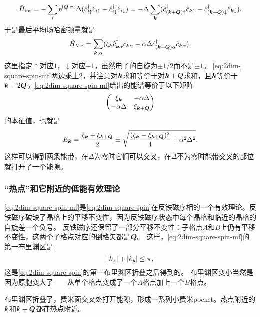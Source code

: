 \documentclass[hyperref, UTF8, a4paper]{ctexart}
\newcommand*{\ii}{\mathrm{i}}
\newcommand*{\ee}{\mathrm{e}}
\begin{document}
\begin{equation}
    \hat{H}_\text{int} = - \sum_i \ee^{\ii \vb*{Q} \cdot \vb*{r}_i} \Delta (\hat{c}_{i\uparrow}^\dagger \hat{c}_{i \uparrow} - \hat{c}_{i \downarrow}^\dagger \hat{c}_{i \downarrow}) 
    = - \Delta \sum_{\vb*{k}} (\hat{c}_{(\vb*{k} + \vb*{Q})\uparrow}^\dagger \hat{c}_{\vb*{k} \uparrow} - \hat{c}_{(\vb*{k}+\vb*{Q}) \downarrow}^\dagger \hat{c}_{\vb*{k} \downarrow}).
\end{equation}
于是最后平均场哈密顿量就是
\begin{equation}
    \hat{H}_\text{MF} = \sum_{\vb*{k}, \alpha} (\xi_{\vb*{k}} \hat{c}_{\vb*{k} \alpha}^\dagger \hat{c}_{\vb*{k} \alpha} - \alpha \Delta \hat{c}_{(\vb*{k} + \vb*{Q}) \alpha}^\dagger \hat{c}_{\vb*{k} \alpha}).
    \label{eq:2dim-square-spin-mf}
\end{equation}
这里指定$\uparrow$对应$1$，$\downarrow$对应$-1$，虽然电子的自旋为$\pm 1/2$而不是$\pm 1$。
\eqref{eq:2dim-square-spin-mf}两边乘上2，并注意对$\vb*{k}$求和等价于对$\vb*{k}+Q$求和，且$\vb*{k}$等价于$\vb*{k}+2\vb*{Q}$，\eqref{eq:2dim-square-spin-mf}给出的能谱等价于以下矩阵
\[
    \pmqty{\xi_{\vb*{k}} & - \alpha \Delta \\ - \alpha \Delta & \xi_{\vb*{k} + \vb*{Q}}}
\]
的本征值，也就是
\begin{equation}
    E_{\vb*{k}} = \frac{\xi_{\vb*{k}} + \xi_{\vb*{k} + \vb*{Q}}}{2} \pm \sqrt{\frac{(\xi_{\vb*{k}} - \xi_{\vb*{k}+\vb*{Q}})^2}{4} + \alpha^2 \Delta^2}.
\end{equation}
这样可以得到两条能带，在$\Delta$为零时它们可以交叉，在$\Delta$不为零时能带交叉的部位就打开了一个能隙。

\subsubsection{“热点”和它附近的低能有效理论}

\eqref{eq:2dim-square-spin-mf}是\eqref{eq:2dim-square-spin}在反铁磁序相的一个有效理论。反铁磁序破缺了晶格上的平移不变性，因为反铁磁序状态中每个晶格和临近的晶格的自旋差一个负号。
反铁磁序还保留了一部分平移不变性：子格点$A$和$B$上仍有平移不变性，这两个子格点对应的倒格矢都是$\vb*{Q}$。
这样，\eqref{eq:2dim-square-spin-mf}的第一布里渊区是
\[
    \abs{k_x} + \abs{k_y} \leq \pi,
\]
这是\eqref{eq:2dim-square-spin}的第一布里渊区折叠之后得到的。
布里渊区变小当然是因为原胞变大了——从单个格点变成了一个$A$格点加上一个$B$格点。

布里渊区折叠了，费米面交叉处打开能隙，形成一系列小费米pocket。热点附近的$\vb*{k}$和$\vb*{k} + \vb*{Q}$都在热点附近。
\end{document}
